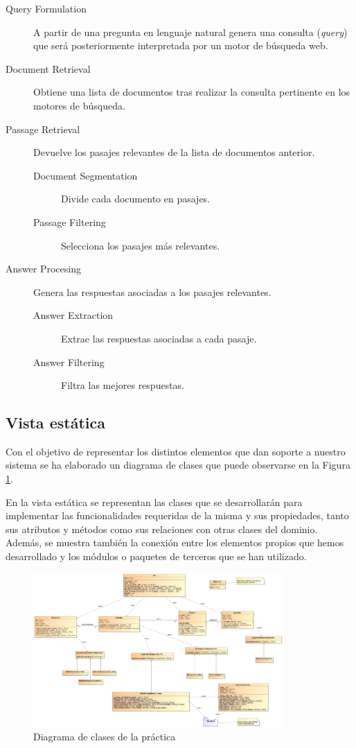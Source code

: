 \documentclass[12pt,a4paper,titlepage]{article}
\begin{document}
\begin{description}
	\item[Query Formulation] A partir de una pregunta en lenguaje natural genera una consulta (\emph{query}) que será posteriormente interpretada por un motor de búsqueda web.
	\item[Document Retrieval] Obtiene una lista de documentos tras realizar la consulta pertinente en los motores de búsqueda.
	\item[Passage Retrieval] Devuelve los pasajes relevantes de la lista de documentos anterior.
		\begin{description}
			\item[Document Segmentation] Divide cada documento en pasajes.
			\item[Passage Filtering] Selecciona los pasajes más relevantes.
		\end{description}
	\item[Answer Procesing] Genera las respuestas asociadas a los pasajes relevantes.
		\begin{description}
			\item[Answer Extraction] Extrae las respuestas asociadas a cada pasaje.
			\item[Answer Filtering]	Filtra las mejores respuestas.
		\end{description}
\end{description}

\subsection{Vista estática}
Con el objetivo de representar los distintos elementos que dan soporte a nuestro sistema se ha elaborado un diagrama de clases que puede observarse en la Figura \ref{fig:clases}.

En la vista estática se representan las clases que se desarrollarán para implementar las funcionalidades requeridas de la misma y sus propiedades, tanto sus atributos y métodos como sus relaciones con otras clases del dominio. Además, se muestra también la conexión entre los elementos propios que hemos desarrollado y los módulos o paquetes de terceros que se han utilizado.

\begin{figure}[h!]
\begin{center}
\includegraphics[angle=90,width=0.85\textwidth]{res/clases}
\end{center}
\caption{Diagrama de clases de la práctica}
\label{fig:clases}
\end{figure}
\end{document}

